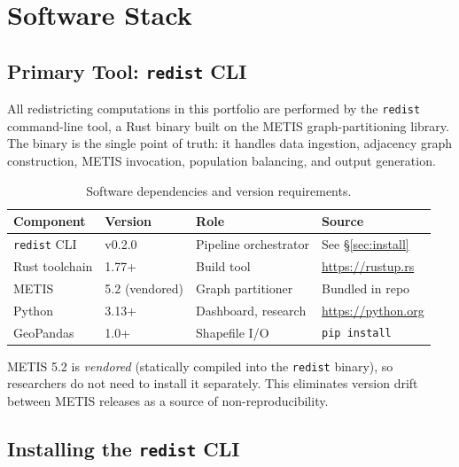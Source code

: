 
\section{Software Stack}
\label{sec:software}

\subsection*{Primary Tool: \texttt{redist} CLI}

All redistricting computations in this portfolio are performed by the
\texttt{redist} command-line tool, a Rust binary built on the METIS
graph-partitioning library.
The binary is the single point of truth: it handles data ingestion,
adjacency graph construction, METIS invocation, population balancing,
and output generation.

\begin{table}[h]
\centering
\caption{Software dependencies and version requirements.}
\label{tab:software}
\begin{tabular}{@{}llll@{}}
\toprule
Component & Version & Role & Source \\
\midrule
\texttt{redist} CLI    & v0.2.0          & Pipeline orchestrator & See \S\ref{sec:install} \\
Rust toolchain         & 1.77+           & Build tool            & \url{https://rustup.rs} \\
METIS                  & 5.2 (vendored)  & Graph partitioner     & Bundled in repo \\
Python                 & 3.13+           & Dashboard, research   & \url{https://python.org} \\
GeoPandas              & 1.0+            & Shapefile I/O         & \texttt{pip install} \\
\bottomrule
\end{tabular}
\end{table}

\noindent METIS 5.2 is \emph{vendored} (statically compiled into the
\texttt{redist} binary), so researchers do not need to install it separately.
This eliminates version drift between METIS releases as a source of
non-reproducibility.

\subsection*{Installing the \texttt{redist} CLI}
\label{sec:install}

